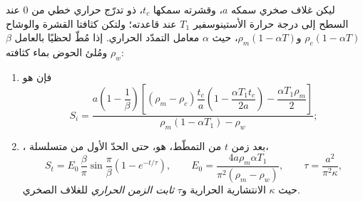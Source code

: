 \begin{proposition}\label{prop:b2:basins-compared:stretching}
ليكن غلاف صخري سمكه $a$، وقشرته سمكها $t_c$، ذو تدرّج حراري خطي من
$0$ عند السطح إلى درجة حرارة الأستينوسفير $T_1$ عند قاعدته؛ ولتكن كثافتا القشرة والوشاح
$\rho_c(1 - \alpha T)$ و$\rho_m(1 - \alpha T)$، حيث $\alpha$ معامل التمدّد
الحراري. إذا مُطّ لحظيًا بالعامل $\beta$ ومُلئ الحوض
بماء كثافته $\rho_w$:
\begin{enumerate}
  \item فإن  هو
  \[
    S_i = \frac{a\left(1 - \dfrac{1}{\beta}\right)\left[(\rho_m - \rho_c)\dfrac{t_c}{a}
          \left(1 - \dfrac{\alpha T_1 t_c}{2a}\right) - \dfrac{\alpha T_1 \rho_m}{2}\right]}
          {\rho_m(1 - \alpha T_1) - \rho_w};
  \]
  \item {}، بعد زمن $t$ من التمطّط، هو، حتى الحدّ الأول من متسلسلة،
  \[
    S_t = E_0\,\frac{\beta}{\pi}\sin\frac{\pi}{\beta}\left(1 - e^{-t/\tau}\right),\qquad
    E_0 = \frac{4a\rho_m\alpha T_1}{\pi^2(\rho_m - \rho_w)},\qquad
    \tau = \frac{a^2}{\pi^2\kappa},
  \]
  حيث $\kappa$ الانتشارية الحرارية و$\tau$ \emph{ثابت الزمن
  الحراري} للغلاف الصخري.
\end{enumerate}
\end{proposition}

